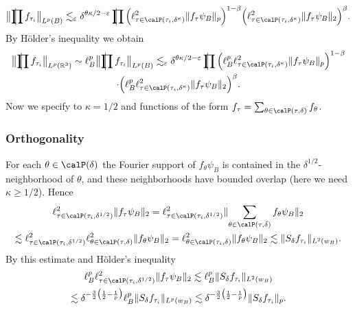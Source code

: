 \begin{equation}
\norm[\big]{ \avprod f_{\tau_i} }_{L^{p}(B)}
\lesssim_\epsilon
\delta^{\theta \kappa/2-\epsilon} \avprod \Big( \ell^{2}_{\tau \in \Part[\tau_i]{\delta^{\kappa}}} \norm{f_{\tau} \psi_{B}}_{p} \Big)^{1-\beta}
\Big( \ell^{2}_{\tau \in \Part[\tau_i]{\delta^{\kappa}}} \norm{f_{\tau} \psi_{B}}_{2} \Big)^{\beta}.
\end{equation}
By H\"older's inequality we obtain
\begin{multline}
\label{eq:jlee-dec}
\norm[\big]{ \avprod f_{\tau_i} }_{L^{p}(\R^{3})}
\sim
\ell^{p}_{B} \norm[\big]{ \avprod f_{\tau_i} }_{L^{p}(B)}
\lesssim_\epsilon
\delta^{\theta \kappa/2-\epsilon} \avprod \Big( \ell^{p}_{B} \ell^{2}_{\tau \in \Part[\tau_i]{\delta^{\kappa}}} \norm{f_{\tau} \psi_{B}}_{p} \Big)^{1-\beta}\\
\cdot \Big( \ell^{p}_{B} \ell^{2}_{\tau \in \Part[\tau_i]{\delta^{\kappa}}} \norm{f_{\tau} \psi_{B}}_{2} \Big)^{\beta}.
\end{multline}
Now we specify to $\kappa=1/2$ and functions of the form $f_{\tau} = \sum_{\theta\in\Part[\tau]{\delta}} f_{\theta}$.

\subsubsection{Orthogonality}
For each $\theta\in\Part{\delta}$ the Fourier support of $f_{\theta} \psi_B$ is contained in the $\delta^{1/2}$-neighborhood of $\theta$, and these neighborhoods have bounded overlap (here we need $\kappa\geq 1/2$).
Hence
\begin{multline*}
\ell^{2}_{\tau \in \Part[\tau_i]{\delta^{1/2}}} \norm{f_{\tau} \psi_{B}}_{2}
=
\ell^{2}_{\tau \in \Part[\tau_i]{\delta^{1/2}}} \norm{\sum_{\theta \in \Part[\tau]{\delta}}f_{\theta} \psi_{B}}_{2}\\
\lesssim
\ell^{2}_{\tau \in \Part[\tau_i]{\delta^{1/2}}} \ell^{2}_{\theta \in \Part[\tau]{\delta}} \norm{ f_{\theta} \psi_{B}}_{2}
=
\ell^{2}_{\theta \in \Part[\tau_i]{\delta}} \norm{ f_{\theta} \psi_{B}}_{2}
\lesssim
\norm{ S_{\delta} f_{\tau_{i}} }_{L^{2}(w_{B})}.
\end{multline*}
By this estimate and H\"older's inequality
\begin{multline}\label{L2part}
\ell^{p}_{B} \ell^{2}_{\tau \in \Part[\tau_i]{\delta^{1/2}}} \norm{f_{\tau} \psi_{B}}_{2}
\lesssim
\ell^{p}_{B} \norm{S_\delta f_{\tau_i}}_{L^2(w_{B})}\\
\lesssim
\delta^{-\frac{3}{2}\big( \frac{1}{2} - \frac{1}{p} \big)} \ell^{p}_{B} \norm{S_\delta f_{\tau_i}}_{L^p(w_{B})}
\lesssim
\delta^{-\frac{3}{2}\big( \frac{1}{2} - \frac{1}{p} \big)} \norm{ S_\delta f_{\tau_i}}_{p}.
\end{multline}


